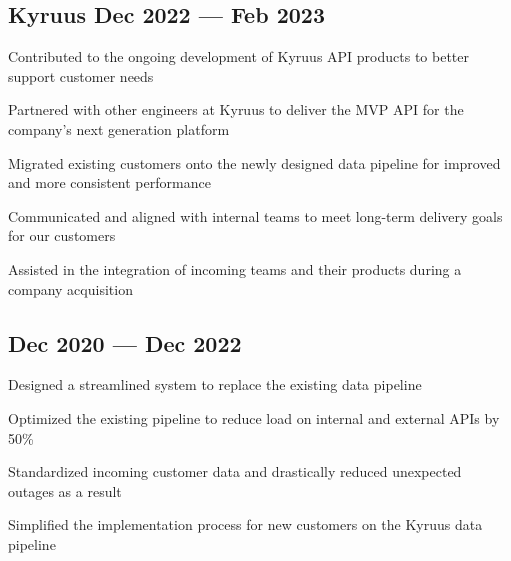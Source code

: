 

\subsection{{Kyruus \hfill Dec 2022 --- Feb 2023}}
\begin{zitemize}
\item Contributed to the ongoing development of Kyruus API products to better support customer needs
\item Partnered with other engineers at Kyruus to deliver the MVP API for the company's next generation platform
\item Migrated existing customers onto the newly designed data pipeline for improved and more consistent performance
\item Communicated and aligned with internal teams to meet long-term delivery goals for our customers
\item Assisted in the integration of incoming teams and their products during a company acquisition
\end{zitemize}

\subsection{{\hfill Dec 2020 --- Dec 2022}}
\begin{zitemize}
\item Designed a streamlined system to replace the existing data pipeline
\item Optimized the existing pipeline to reduce load on internal and external APIs by 50\%
\item Standardized incoming customer data and drastically reduced unexpected outages as a result
\item Simplified the implementation process for new customers on the Kyruus data pipeline
\end{zitemize}


